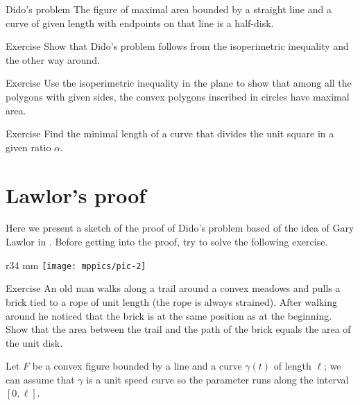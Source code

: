 \begin{thm}{Dido's problem}
The figure of maximal area bounded by a straight line and a curve of given length with endpoints on that line is a half-disk.
\end{thm}

\begin{thm}{Exercise}\label{ex:dido-isop}
Show that Dido's problem follows from the isoperimetric inequality and the other way around.
\end{thm}

\begin{thm}{Exercise}
Use the isoperimetric inequality in the plane to show that 
among all the polygons with given sides,
the convex polygons inscribed in circles have maximal area.
\end{thm}

\begin{thm}{Exercise}
Find the minimal length of a curve that divides the unit square in a given ratio $\alpha$.  
\end{thm}

\section{Lawlor's proof}

Here we present a sketch of the proof of Dido's problem based of the idea of Gary Lawlor in \cite{lawlor}.
Before getting into the proof, try to solve the following exercise.

{

\begin{wrapfigure}{r}{34 mm}
\vskip-4mm
\centering
\texttt{[image: mppics/pic-2]}
\end{wrapfigure}

\begin{thm}{Exercise}
An old man walks along a trail around a convex meadows and pulls a brick tied to a rope of unit length (the rope is always strained).
After walking around he noticed that the brick is at the same position as at the beginning.
Show that the area between the trail and the path of the brick equals the area of the unit disk. 
\end{thm}

}

Let $F$ be a convex figure bounded by a line and a curve $\gamma(t)$ of length $\ell$;
we can assume that $\gamma$ is a unit speed curve so the parameter runs along the interval $[0,\ell]$.

